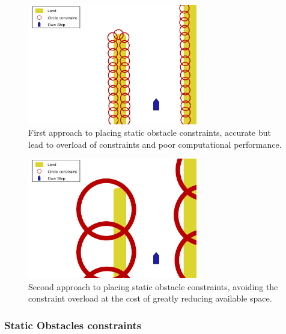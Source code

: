\begin{figure}[ht!]
    \centering
    \includegraphics[width=0.66\textwidth]{Images/StaticObs_Naive.pdf}
    \caption{First approach to placing static obstacle constraints, accurate but lead to overload of constraints and poor computational performance.}     \label{FIG: Static Obs Naive approach 1}
\end{figure}

\begin{figure}[ht!]
    \centering 
    \includegraphics[width=0.66\textwidth]{Images/StaticObs_Naive2.pdf}
    \caption{Second approach to placing static obstacle constraints, avoiding the constraint overload at the cost of greatly reducing available space.}     \label{FIG: Static Obs Naive approach 2}
\end{figure}

\subsubsection*{Static Obstacles constraints}

